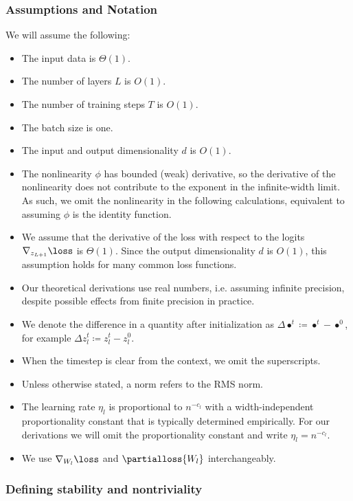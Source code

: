\subsubsection{Assumptions and Notation}
\label{app:theory_assumptions}
We will assume the following:
\begin{itemize}
    \setlength\itemsep{-0.2em}
    \item The input data is $\Theta(1)$.
    \item The number of layers $L$ is $O(1)$.
    \item The number of training steps $T$ is $O(1)$.
    \item The batch size is one.
    \item The input and output dimensionality $d$ is $O(1)$.
    \item The nonlinearity $\phi$ has bounded (weak) derivative, so the derivative of the nonlinearity does not contribute to the exponent in the infinite-width limit. As such, we omit the nonlinearity in the following calculations, equivalent to assuming $\phi$ is the identity function.
    \item We assume that the derivative of the loss with respect to the logits $\nabla_{z_{L+1}} \loss$ is $\Theta(1)$. Since the output dimensionality $d$ is $O(1)$, this assumption holds for many common loss functions.
    \item Our theoretical derivations use real numbers, i.e. assuming infinite precision, despite possible effects from finite precision in practice.
    \item We denote the difference in a quantity after initialization as $\Delta \bullet^t \coloneqq \bullet ^t - \bullet ^0$, for example $\Delta z_l^t \coloneqq z_l ^t - z_l ^0$.
    \item When the timestep is clear from the context, we omit the superscripts.
    \item Unless otherwise stated, a norm refers to the RMS norm.
    \item The learning rate $\eta_l$ is proportional to $n^{-c_l}$ with a width-independent proportionality constant that is typically determined empirically. For our derivations we will omit the proportionality constant and write $\eta_l = n^{-c_l}$.
    \item We use $\nabla_{W_l} \loss$ and $\partialloss{W_l}$ interchangeably.
\end{itemize}


\subsubsection{Defining stability and nontriviality}
\label{app:theory_stability_nontriviality_def}

